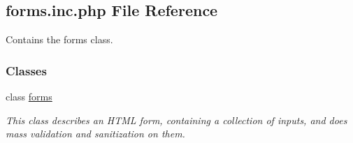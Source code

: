 \hypertarget{forms_8inc_8php}{\subsection{forms.\-inc.\-php File Reference}
\label{forms_8inc_8php}
}


Contains the forms class.  


\subsubsection*{Classes}
\begin{DoxyCompactItemize}
\item 
class \hyperlink{classforms}{forms}
\begin{DoxyCompactList}\small\item\em This class describes an H\-T\-M\-L form, containing a collection of inputs, and does mass validation and sanitization on them. \end{DoxyCompactList}\end{DoxyCompactItemize}
